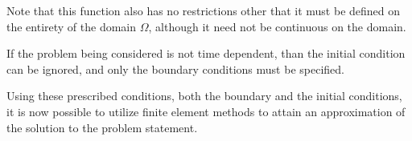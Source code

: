 \documentclass[../fem.tex]{subfile}
\begin{document}
Note that this function also has no restrictions other that it must be defined
on the entirety of the domain $\Omega$, although it need not be continuous on
the domain.

If the problem being considered is not time dependent, than the initial
condition can be ignored, and only the boundary conditions must be specified.

Using these prescribed conditions, both the boundary and the initial
conditions, it is now possible to utilize finite element methods to attain an
approximation of the solution to the problem statement.
\end{document}
